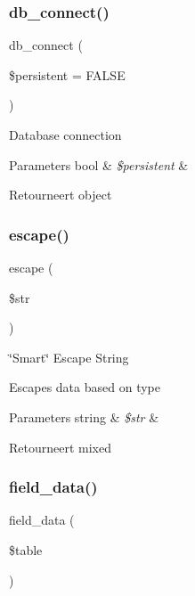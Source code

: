 \subsubsection{\texorpdfstring{db\_connect()}{db\_connect()}}
{\footnotesize\ttfamily db\+\_\+connect (\begin{DoxyParamCaption}\item[{}]{\$persistent = {\ttfamily FALSE} }\end{DoxyParamCaption})}

Database connection


\begin{DoxyParams}[1]{Parameters}
bool & {\em \$persistent} & \\
\hline
\end{DoxyParams}
\begin{DoxyReturn}{Retourneert}
object 
\end{DoxyReturn}
\mbox{\label{class_c_i___d_b__pdo__pgsql__driver_ac8f37ca5703d4558c732e692194f8cd6}} 
\subsubsection{\texorpdfstring{escape()}{escape()}}
{\footnotesize\ttfamily escape (\begin{DoxyParamCaption}\item[{}]{\$str }\end{DoxyParamCaption})}

\char`\"{}\+Smart\char`\"{} Escape String

Escapes data based on type


\begin{DoxyParams}[1]{Parameters}
string & {\em \$str} & \\
\hline
\end{DoxyParams}
\begin{DoxyReturn}{Retourneert}
mixed 
\end{DoxyReturn}
\mbox{\label{class_c_i___d_b__pdo__pgsql__driver_a90355121e1ed009e0efdbd544ab56efa}} 
\subsubsection{\texorpdfstring{field\_data()}{field\_data()}}
{\footnotesize\ttfamily field\+\_\+data (\begin{DoxyParamCaption}\item[{}]{\$table }\end{DoxyParamCaption})}

